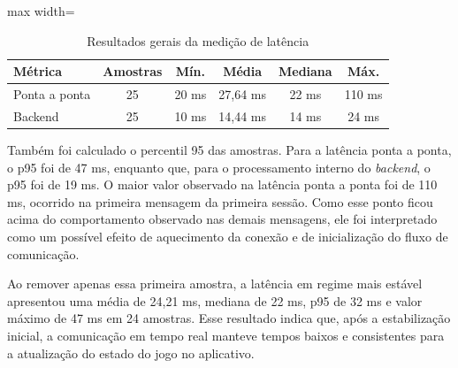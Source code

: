\begin{table}[!ht]
    \centering
    \caption{Resultados gerais da medição de latência}
    \label{tab:latencia-geral}
    \begin{adjustbox}{max width=\columnwidth}
    \begin{tabular}{lccccc}
        \hline
        \textbf{Métrica} & \textbf{Amostras} & \textbf{Mín.} & \textbf{Média} & \textbf{Mediana} & \textbf{Máx.} \\
        \hline
        Ponta a ponta & 25 & 20 ms & 27,64 ms & 22 ms & 110 ms \\
        Backend & 25 & 10 ms & 14,44 ms & 14 ms & 24 ms \\
        \hline
    \end{tabular}
    \end{adjustbox}
\end{table}

Também foi calculado o percentil 95 das amostras. Para a latência ponta a ponta, o p95 foi de 47 ms, enquanto que, para o processamento interno do \textit{backend}, o p95 foi de 19 ms. O maior valor observado na latência ponta a ponta foi de 110 ms, ocorrido na primeira mensagem da primeira sessão. Como esse ponto ficou acima do comportamento observado nas demais mensagens, ele foi interpretado como um possível efeito de aquecimento da conexão e de inicialização do fluxo de comunicação.

Ao remover apenas essa primeira amostra, a latência em regime mais estável apresentou uma média de 24,21 ms, mediana de 22 ms, p95 de 32 ms e valor máximo de 47 ms em 24 amostras. Esse resultado indica que, após a estabilização inicial, a comunicação em tempo real manteve tempos baixos e consistentes para a atualização do estado do jogo no aplicativo.

